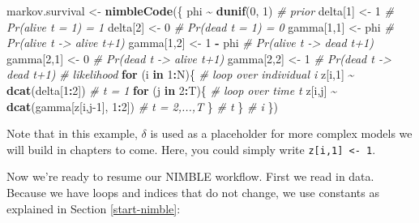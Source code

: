 \documentclass[
  12pt,
]{krantz}
\newenvironment{Shaded}{\begin{snugshade}}{\end{snugshade}}
\newcommand{\CommentTok}[1]{\textcolor[rgb]{0.56,0.35,0.01}{\textit{#1}}}
\newcommand{\ControlFlowTok}[1]{\textcolor[rgb]{0.13,0.29,0.53}{\textbf{#1}}}
\newcommand{\DecValTok}[1]{\textcolor[rgb]{0.00,0.00,0.81}{#1}}
\newcommand{\FunctionTok}[1]{\textcolor[rgb]{0.13,0.29,0.53}{\textbf{#1}}}
\newcommand{\NormalTok}[1]{#1}
\newcommand{\OtherTok}[1]{\textcolor[rgb]{0.56,0.35,0.01}{#1}}
\newcommand{\SpecialCharTok}[1]{\textcolor[rgb]{0.81,0.36,0.00}{\textbf{#1}}}
\begin{document}
\begin{Shaded}
\begin{Highlighting}[]
\NormalTok{markov.survival }\OtherTok{\textless{}{-}} \FunctionTok{nimbleCode}\NormalTok{(\{}
\NormalTok{  phi }\SpecialCharTok{\textasciitilde{}} \FunctionTok{dunif}\NormalTok{(}\DecValTok{0}\NormalTok{, }\DecValTok{1}\NormalTok{) }\CommentTok{\# prior}
\NormalTok{  delta[}\DecValTok{1}\NormalTok{] }\OtherTok{\textless{}{-}} \DecValTok{1}          \CommentTok{\# Pr(alive t = 1) = 1}
\NormalTok{  delta[}\DecValTok{2}\NormalTok{] }\OtherTok{\textless{}{-}} \DecValTok{0}          \CommentTok{\# Pr(dead t = 1) = 0}
\NormalTok{  gamma[}\DecValTok{1}\NormalTok{,}\DecValTok{1}\NormalTok{] }\OtherTok{\textless{}{-}}\NormalTok{ phi      }\CommentTok{\# Pr(alive t {-}\textgreater{} alive t+1)}
\NormalTok{  gamma[}\DecValTok{1}\NormalTok{,}\DecValTok{2}\NormalTok{] }\OtherTok{\textless{}{-}} \DecValTok{1} \SpecialCharTok{{-}}\NormalTok{ phi  }\CommentTok{\# Pr(alive t {-}\textgreater{} dead t+1)}
\NormalTok{  gamma[}\DecValTok{2}\NormalTok{,}\DecValTok{1}\NormalTok{] }\OtherTok{\textless{}{-}} \DecValTok{0}        \CommentTok{\# Pr(dead t {-}\textgreater{} alive t+1)}
\NormalTok{  gamma[}\DecValTok{2}\NormalTok{,}\DecValTok{2}\NormalTok{] }\OtherTok{\textless{}{-}} \DecValTok{1}        \CommentTok{\# Pr(dead t {-}\textgreater{} dead t+1)}
  \CommentTok{\# likelihood}
  \ControlFlowTok{for}\NormalTok{ (i }\ControlFlowTok{in} \DecValTok{1}\SpecialCharTok{:}\NormalTok{N)\{ }\CommentTok{\# loop over individual i}
\NormalTok{    z[i,}\DecValTok{1}\NormalTok{] }\SpecialCharTok{\textasciitilde{}} \FunctionTok{dcat}\NormalTok{(delta[}\DecValTok{1}\SpecialCharTok{:}\DecValTok{2}\NormalTok{]) }\CommentTok{\# t = 1}
    \ControlFlowTok{for}\NormalTok{ (j }\ControlFlowTok{in} \DecValTok{2}\SpecialCharTok{:}\NormalTok{T)\{ }\CommentTok{\# loop over time t}
\NormalTok{      z[i,j] }\SpecialCharTok{\textasciitilde{}} \FunctionTok{dcat}\NormalTok{(gamma[z[i,j}\DecValTok{{-}1}\NormalTok{], }\DecValTok{1}\SpecialCharTok{:}\DecValTok{2}\NormalTok{]) }\CommentTok{\# t = 2,...,T}
\NormalTok{    \} }\CommentTok{\# t}
\NormalTok{  \} }\CommentTok{\# i}
\NormalTok{\})}
\end{Highlighting}
\end{Shaded}

Note that in this example, \(\delta\) is used as a placeholder for more complex models we will build in chapters to come. Here, you could simply write \texttt{z{[}i,1{]}\ \textless{}-\ 1}.

Now we're ready to resume our NIMBLE workflow. First we read in data. Because we have loops and indices that do not change, we use constants as explained in Section \ref{start-nimble}:
\end{document}
